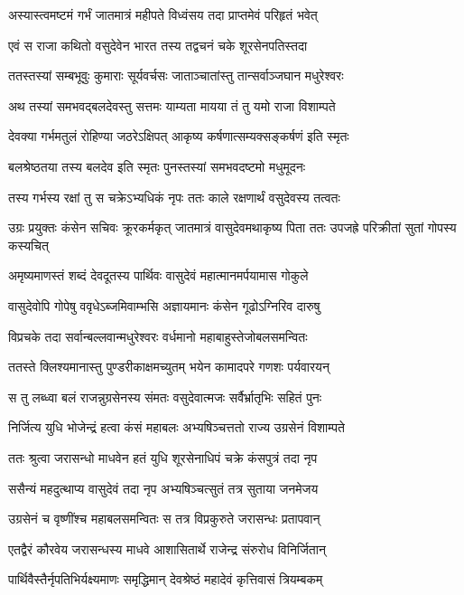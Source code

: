 \twolineshloka
{अस्यास्त्वमष्टमं गर्भं जातमात्रं महीपते}
{विध्वंसय तदा प्राप्तमेवं परिहृतं भवेत्}


\twolineshloka
{एवं स राजा कथितो वसुदेवेन भारत}
{तस्य तद्वचनं चके शूरसेनपतिस्तदा}


\twolineshloka
{ततस्तस्यां सम्बभूवुः कुमाराः सूर्यवर्चसः}
{जाताञ्चातांस्तु तान्सर्वाञ्जघान मधुरेश्वरः}


\twolineshloka
{अथ तस्यां समभवद्बलदेवस्तु सत्तमः}
{याम्यता मायया तं तु यमो राजा विशाम्पते}


\twolineshloka
{देवक्या गर्भमतुलं रोहिण्या जठरेऽक्षिपत्}
{आकृष्य कर्षणात्सम्यक्सङ्कर्षणं इति स्मृतः}


\twolineshloka
{बलश्रेष्ठतया तस्य बलदेव इति स्मृतः}
{पुनस्तस्यां समभवदष्टमो मधुमूदनः}


\twolineshloka
{तस्य गर्भस्य रक्षां तु स चक्रेऽभ्यधिकं नृपः}
{ततः काले रक्षणार्थं वसुदेवस्य तत्वतः}


उग्रः प्रयुक्तः कंसेन सचिवः क्रूरकर्मकृत्
\twolineshloka
{जातमात्रं वासुदेवमथाकृष्य पिता ततः}
{उपजह्रे परिक्रीतां सुतां गोपस्य कस्यचित्}


\twolineshloka
{अमृष्यमाणस्तं शब्दं देवदूतस्य पार्थिवः}
{वासुदेवं महात्मानमर्पयामास गोकुले}


\twolineshloka
{वासुदेवोपि गोपेषु ववृधेऽब्जमिवाम्भसि}
{अज्ञायमानः कंसेन गूढोऽग्निरिव दारुषु}


\twolineshloka
{विप्रचके तदा सर्वान्बल्लवान्मधुरेश्वरः}
{वर्धमानो महाबाहुस्तेजोबलसमन्वितः}


\twolineshloka
{ततस्ते क्लिश्यमानास्तु पुण्डरीकाक्षमच्युतम्}
{भयेन कामादपरे गणशः पर्यवारयन्}


\twolineshloka
{स तु लब्ध्वा बलं राजन्नुग्रसेनस्य संमतः}
{वसुदेवात्मजः सर्वैर्भ्रातृभिः सहितं पुनः}


\twolineshloka
{निर्जित्य युधि भोजेन्द्रं हत्वा कंसं महाबलः}
{अभ्यषिञ्चत्ततो राज्य उग्रसेनं विशाम्पते}


\twolineshloka
{ततः श्रुत्वा जरासन्धो माधवेन हतं युधि}
{शूरसेनाधिपं चक्रे कंसपुत्रं तदा नृप}


\twolineshloka
{ससैन्यं महदुत्थाप्य वासुदेवं तदा नृप}
{अभ्यषिञ्चत्सुतं तत्र सुताया जनमेजय}


\twolineshloka
{उग्रसेनं च वृष्णींश्च महाबलसमन्वितः}
{स तत्र विप्रकुरुते जरासन्धः प्रतापवान्}


\twolineshloka
{एतद्वैरं कौरवेय जरासन्धस्य माधवे}
{आशासितार्थे राजेन्द्र संरुरोध विनिर्जितान्}


\twolineshloka
{पार्थिवैस्तैर्नृपतिभिर्यक्ष्यमाणः समृद्धिमान्}
{देवश्रेष्ठं महादेवं कृत्तिवासं त्रियम्बकम्}


